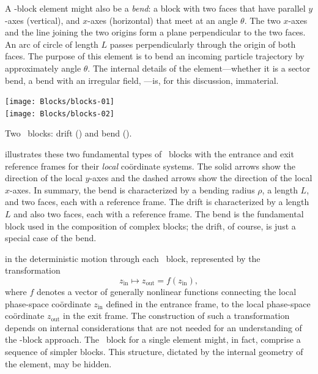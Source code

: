 %
A \LEGO-block element might also be a \emph{bend}: a block with two
faces that have parallel $y$-axes (vertical), and $x$-axes (horizontal)%
that meet at an angle $\theta$. The two $x$-axes and the line joining
the two origins form a plane perpendicular to the two faces. An arc
of circle of length $L$ passes perpendicularly through the origin of
both faces. The purpose of this element is to bend an incoming
particle trajectory by approximately angle $\theta$. The internal
details of the element---whether it is a sector bend, a bend with
an irregular field, \etc---is, for this discussion, immaterial.

\begin{marginfigure}
  \texttt{[image: Blocks/blocks-01]}\\ \noindent
  \texttt{[image: Blocks/blocks-02]}
  \caption{Two \LEGO\ blocks: drift () and bend ().}
  \label{fig:LEGO.BandD}
\end{marginfigure}

 illustrates these two fundamental types of
\LEGO\ blocks with the entrance and exit reference frames for their
\emph{local} co\"ordinate systems. The solid arrows show the direction
of the local $y$-axes and the dashed arrows show the direction of the
local $x$-axes.
In summary, the bend is characterized by a bending radius $\rho$,
a length $L$, and two faces, each with a reference frame.  The
drift is characterized by a length $L$ and also two faces, each
with a reference frame. The bend is the fundamental block used in
the composition of complex blocks; the drift, of course, is just a
special case of the bend.

 in the deterministic motion through
each \LEGO\ block, represented by the transformation
\begin{equation}\label{eq:zin.zout}
  z_\text{in} \mapsto z_\text{out} = f(z_\text{in}),
\end{equation}
where $f$ denotes a vector of generally nonlinear functions
connecting the local phase-space co\"ordinate $z_\text{in}$
defined in the entrance frame, to the local phase-space
co\"ordinate $z_\text{out}$ in the exit frame. The construction
of such a transformation depends on internal considerations
that are not needed for an understanding of the \LEGO-block
approach. The \LEGO\ block for a single element might, in fact,
comprise a sequence of simpler blocks. This structure, dictated
by the internal geometry of the element, may be hidden.

